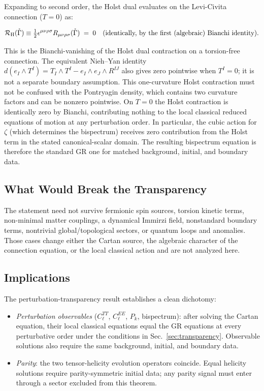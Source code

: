 \documentclass[aps,prd,twocolumn,superscriptaddress,showpacs,preprintnumbers,nofootinbib,longbibliography,floatfix]{revtex4-2}
\begin{document}
Expanding to second order, the Holst dual evaluates on the Levi-Civita
connection ($T=0$) as:
\begin{widetext}
\begin{equation}
\mathcal{R}_{\rm H}(\mathring{\Gamma}) \equiv \tfrac{1}{2}\epsilon^{\mu\nu\rho\sigma}
R_{\mu\nu\rho\sigma}(\mathring{\Gamma}) \;=\; 0
\quad\text{(identically, by the first (algebraic) Bianchi identity)}.
\end{equation}
\end{widetext}
This is the Bianchi-vanishing of the Holst dual contraction on a torsion-free
connection.  The equivalent Nieh--Yan identity
$d(e_I\wedge T^I)=T_I\wedge T^I-e_I\wedge e_J\wedge R^{IJ}$ also gives zero
pointwise when $T^I=0$; it is not a separate boundary assumption.  This
one-curvature Holst contraction must not be confused with the Pontryagin
density, which contains two curvature factors and can be nonzero pointwise.
On $T=0$ the Holst contraction is identically zero by Bianchi, contributing
nothing to the local classical reduced equations of motion at any perturbation order. In
particular, the cubic action for $\zeta$ (which determines the bispectrum)
receives zero contribution from the Holst term in the stated canonical-scalar
domain. The resulting bispectrum equation is therefore the standard GR one
for matched background, initial, and boundary data.

\subsection{What Would Break the Transparency}

The statement need not survive fermionic spin sources, torsion kinetic terms,
non-minimal matter couplings, a dynamical Immirzi field, nonstandard boundary
terms, nontrivial global/topological sectors, or quantum loops and anomalies.
Those cases change either the Cartan source, the algebraic character of the
connection equation, or the local classical action and are not analyzed here.

\subsection{Implications}

The perturbation-transparency result establishes a clean dichotomy:
\begin{itemize}[leftmargin=*]
\item \textit{Perturbation observables} ($C_\ell^{TT}$, $C_\ell^{EE}$, $P_k$,
bispectrum): after solving the Cartan equation, their local classical equations
equal the GR equations at every perturbative order under the conditions in
Sec.~\ref{sec:transparency}.  Observable solutions also require the same
background, initial, and boundary data.
\item \textit{Parity}: the two tensor-helicity evolution operators coincide.
Equal helicity solutions require parity-symmetric initial data; any parity
signal must enter through a sector excluded from this theorem.
\end{itemize}
\end{document}
